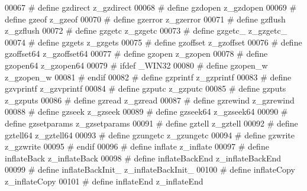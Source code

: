 \begin{DoxyCode}
00067 \textcolor{preprocessor}{#    define gzdirect              z\_gzdirect}
00068 \textcolor{preprocessor}{#    define gzdopen               z\_gzdopen}
00069 \textcolor{preprocessor}{#    define gzeof                 z\_gzeof}
00070 \textcolor{preprocessor}{#    define gzerror               z\_gzerror}
00071 \textcolor{preprocessor}{#    define gzflush               z\_gzflush}
00072 \textcolor{preprocessor}{#    define gzgetc                z\_gzgetc}
00073 \textcolor{preprocessor}{#    define gzgetc\_               z\_gzgetc\_}
00074 \textcolor{preprocessor}{#    define gzgets                z\_gzgets}
00075 \textcolor{preprocessor}{#    define gzoffset              z\_gzoffset}
00076 \textcolor{preprocessor}{#    define gzoffset64            z\_gzoffset64}
00077 \textcolor{preprocessor}{#    define gzopen                z\_gzopen}
00078 \textcolor{preprocessor}{#    define gzopen64              z\_gzopen64}
00079 \textcolor{preprocessor}{#    ifdef \_WIN32}
00080 \textcolor{preprocessor}{#      define gzopen\_w              z\_gzopen\_w}
00081 \textcolor{preprocessor}{#    endif}
00082 \textcolor{preprocessor}{#    define gzprintf              z\_gzprintf}
00083 \textcolor{preprocessor}{#    define gzvprintf             z\_gzvprintf}
00084 \textcolor{preprocessor}{#    define gzputc                z\_gzputc}
00085 \textcolor{preprocessor}{#    define gzputs                z\_gzputs}
00086 \textcolor{preprocessor}{#    define gzread                z\_gzread}
00087 \textcolor{preprocessor}{#    define gzrewind              z\_gzrewind}
00088 \textcolor{preprocessor}{#    define gzseek                z\_gzseek}
00089 \textcolor{preprocessor}{#    define gzseek64              z\_gzseek64}
00090 \textcolor{preprocessor}{#    define gzsetparams           z\_gzsetparams}
00091 \textcolor{preprocessor}{#    define gztell                z\_gztell}
00092 \textcolor{preprocessor}{#    define gztell64              z\_gztell64}
00093 \textcolor{preprocessor}{#    define gzungetc              z\_gzungetc}
00094 \textcolor{preprocessor}{#    define gzwrite               z\_gzwrite}
00095 \textcolor{preprocessor}{#  endif}
00096 \textcolor{preprocessor}{#  define inflate               z\_inflate}
00097 \textcolor{preprocessor}{#  define inflateBack           z\_inflateBack}
00098 \textcolor{preprocessor}{#  define inflateBackEnd        z\_inflateBackEnd}
00099 \textcolor{preprocessor}{#  define inflateBackInit\_      z\_inflateBackInit\_}
00100 \textcolor{preprocessor}{#  define inflateCopy           z\_inflateCopy}
00101 \textcolor{preprocessor}{#  define inflateEnd            z\_inflateEnd}

\end{DoxyCode}
